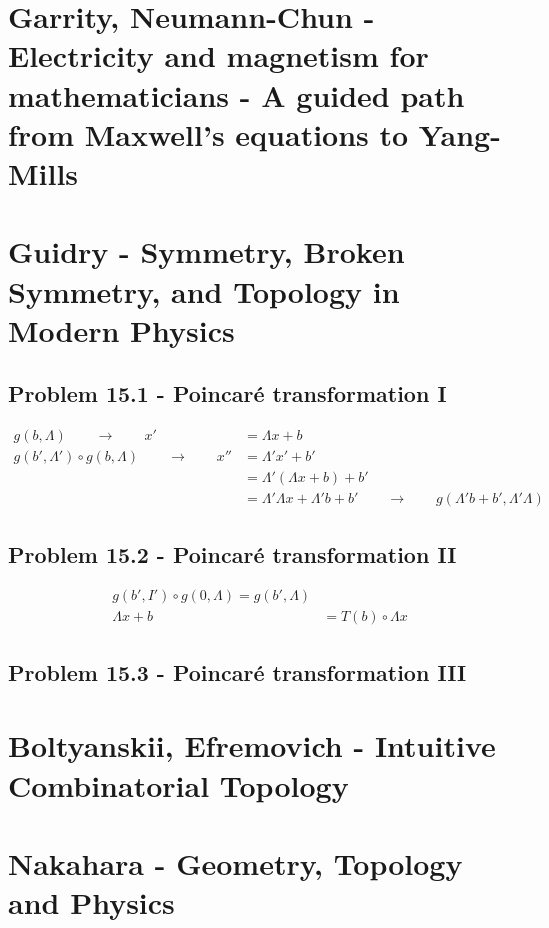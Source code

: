 \documentclass[10pt,a4paper]{book}
\theoremstyle{definition}
\begin{document}
\section{{\sc Garrity, Neumann-Chun} - Electricity and magnetism for mathematicians - A guided path from Maxwell's equations to Yang-Mills}

\section{{\sc Guidry} - Symmetry, Broken Symmetry, and Topology in Modern Physics}

\subsection{Problem 15.1 - Poincaré transformation I}
\begin{align}
g(b,\Lambda)\qquad\rightarrow\qquad x'&=\Lambda x+b\\
g(b',\Lambda')\circ g(b,\Lambda)\qquad\rightarrow\qquad x''&=\Lambda'x'+b'\\
&=\Lambda'(\Lambda x+b)+b'\\
&=\Lambda'\Lambda x+\Lambda'b+b'\qquad\rightarrow\qquad g(\Lambda'b+b',\Lambda'\Lambda)
\end{align}

\subsection{Problem 15.2 - Poincaré transformation II}
\begin{align}
g(b',I')\circ g(0,\Lambda)= g(b',\Lambda)\\
\Lambda x + b&=T(b)\circ\Lambda x
\end{align}

\subsection{Problem 15.3 - Poincaré transformation III}

\section{{\sc Boltyanskii, Efremovich} - Intuitive Combinatorial Topology}

\section{{\sc Nakahara} - Geometry, Topology and Physics}
\end{document}
